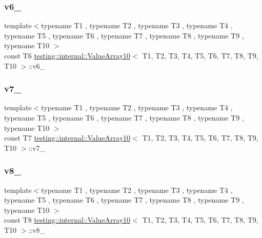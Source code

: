 \subsubsection{\texorpdfstring{v6\_}{v6\_}}
{\footnotesize\ttfamily template$<$typename T1 , typename T2 , typename T3 , typename T4 , typename T5 , typename T6 , typename T7 , typename T8 , typename T9 , typename T10 $>$ \\
const T6 \mbox{\hyperlink{classtesting_1_1internal_1_1_value_array10}{testing\+::internal\+::\+Value\+Array10}}$<$ T1, T2, T3, T4, T5, T6, T7, T8, T9, T10 $>$\+::v6\+\_\+\hspace{0.3cm}{\ttfamily [private]}}

\mbox{\label{classtesting_1_1internal_1_1_value_array10_a63aaf573e558ade3c9030ba041f7590e}} 
\subsubsection{\texorpdfstring{v7\_}{v7\_}}
{\footnotesize\ttfamily template$<$typename T1 , typename T2 , typename T3 , typename T4 , typename T5 , typename T6 , typename T7 , typename T8 , typename T9 , typename T10 $>$ \\
const T7 \mbox{\hyperlink{classtesting_1_1internal_1_1_value_array10}{testing\+::internal\+::\+Value\+Array10}}$<$ T1, T2, T3, T4, T5, T6, T7, T8, T9, T10 $>$\+::v7\+\_\+\hspace{0.3cm}{\ttfamily [private]}}

\mbox{\label{classtesting_1_1internal_1_1_value_array10_a70ba492f0d0f54d5dae53c05de44bcbe}} 
\subsubsection{\texorpdfstring{v8\_}{v8\_}}
{\footnotesize\ttfamily template$<$typename T1 , typename T2 , typename T3 , typename T4 , typename T5 , typename T6 , typename T7 , typename T8 , typename T9 , typename T10 $>$ \\
const T8 \mbox{\hyperlink{classtesting_1_1internal_1_1_value_array10}{testing\+::internal\+::\+Value\+Array10}}$<$ T1, T2, T3, T4, T5, T6, T7, T8, T9, T10 $>$\+::v8\+\_\+\hspace{0.3cm}{\ttfamily [private]}}

